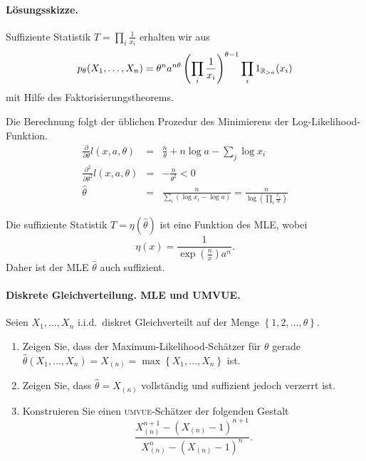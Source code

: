 \paragraph*{Lösungsskizze. }
Suffiziente Statistik $T= \prod_i \frac{1}{x_i}$ erhalten wir aus 
\begin{equation}
    p_\theta(X_1,\ldots,X_n) = 
    \theta^n a^{n\theta} \left( \prod_i \frac{1}{x_i} \right)^{\theta-1} \prod_i 1_{\mathbb R_{>a}}(x_i)
\end{equation}
mit Hilfe des Faktorisierungstheorems.

Die Berechnung folgt der üblichen Prozedur des Minimierens der Log-Likelihood-Funktion.
\begin{eqnarray}
    \frac{\partial}{\partial \theta} l(x,a,\theta) &=& 
    \frac{n}{\theta} + n \log a -\sum_{j}^{} \log x_i \\
    \frac{\partial^2}{\partial \theta^2} l(x,a,\theta) &=& - \frac{n}{\theta^2} < 0 \\
    \hat\theta &=& \frac{n}{ \sum_{i}^{} \left( \log x_i - \log a \right)} 
    = \frac{n}{ \log \left( \prod_i \frac{x_i}{a}  \right) }
\end{eqnarray}

Die suffiziente Statistik $T=\eta (\hat\theta)$ ist eine Funktion des MLE, wobei 
\begin{equation}
    \eta(x) = \frac{1}{ \exp\left( \frac{n}{x} \right) a^n}.
\end{equation}
Daher ist der MLE $\hat\theta$ auch suffizient.



\paragraph{Diskrete Gleichverteilung. MLE und UMVUE.} Seien $X_1,\ldots,X_n$ i.i.d.\ 
diskret Gleichverteilt auf der Menge $\left\{ 1,2,\ldots,\theta \right\}$. 
\begin{enumerate}
    \item Zeigen Sie, dass der Maximum-Likelihood-Schätzer für $\theta$ gerade
        $\hat \theta(X_1,\ldots,X_n) = X_{(n)} = \max \left\{ X_1,\ldots,X_n
        \right\}$ ist.  
    \item Zeigen Sie, dass $\hat \theta = X_{(n)}$ vollständig und suffizient
        jedoch verzerrt ist.
    \item Konstruieren Sie einen \textsc{umvue}-Schätzer der folgenden Gestalt
        \begin{equation*}
            \frac{ X_{(n)}^{n+1} - ( X_{(n)} - 1)^{n+1}  }{ X_{(n)}^n - (X_{(n)} -1)^n }.
        \end{equation*}
\end{enumerate}

